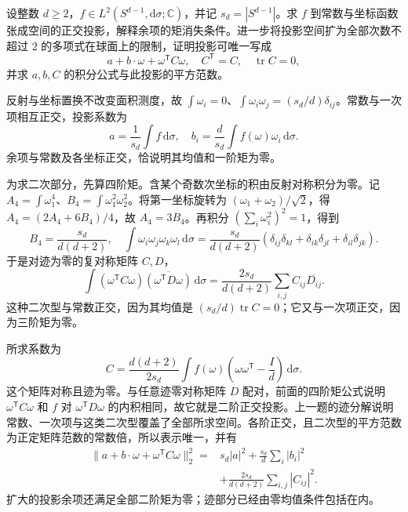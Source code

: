 \begin{exercise}\label{b2:ex:B2-sphere-projection}
设整数 \(d\ge2\)，\(f\in L^2(S^{d-1},\mathrm d\sigma;\mathbb C)\)，并记 \(s_d=|S^{d-1}|\)。求 \(f\) 到常数与坐标函数张成空间的正交投影，解释余项的矩消失条件。进一步将投影空间扩为全部次数不超过 \(2\) 的多项式在球面上的限制，证明投影可唯一写成
\[
 a+b\cdot\omega+\omega^{\mathsf T}C\omega,
 \quad C^{\mathsf T}=C,\quad\operatorname{tr}C=0,
\]
并求 \(a,b,C\) 的积分公式与此投影的平方范数。
\end{exercise}
\begin{solution}
反射与坐标置换不改变面积测度，故 \(\int\omega_i=0\)、\(\int\omega_i\omega_j=(s_d/d)\delta_{ij}\)。常数与一次项相互正交，投影系数为
\[
 a=\frac1{s_d}\int f\,\mathrm d\sigma,
 \quad b_i=\frac d{s_d}\int f(\omega)\omega_i\,\mathrm d\sigma.
\]
余项与常数及各坐标正交，恰说明其均值和一阶矩为零。

为求二次部分，先算四阶矩。含某个奇数次坐标的积由反射对称积分为零。记 \(A_4=\int\omega_1^4\)、\(B_4=\int\omega_1^2\omega_2^2\)。将第一坐标旋转为 \((\omega_1+\omega_2)/\sqrt2\)，得 \(A_4=(2A_4+6B_4)/4\)，故 \(A_4=3B_4\)。再积分 \((\sum_i\omega_i^2)^2=1\)，得到
\[
 B_4=\frac{s_d}{d(d+2)},\quad
 \int\omega_i\omega_j\omega_k\omega_l\,\mathrm d\sigma
 =\frac{s_d}{d(d+2)}
 (\delta_{ij}\delta_{kl}+\delta_{ik}\delta_{jl}+\delta_{il}\delta_{jk}).
\]
于是对迹为零的复对称矩阵 \(C,D\)，
\[
 \int(\omega^{\mathsf T}C\omega)
       \overline{(\omega^{\mathsf T}D\omega)}\,\mathrm d\sigma
 =\frac{2s_d}{d(d+2)}\sum_{i,j}C_{ij}\overline{D_{ij}}.
\]
这种二次型与常数正交，因为其均值是 \((s_d/d)\operatorname{tr}C=0\)；它又与一次项正交，因为三阶矩为零。

所求系数为
\[
 C=\frac{d(d+2)}{2s_d}
      \int f(\omega)\left(\omega\omega^{\mathsf T}-\frac Id\right)
                       \,\mathrm d\sigma.
\]
这个矩阵对称且迹为零。与任意迹零对称矩阵 \(D\) 配对，前面的四阶矩公式说明 \(\omega^{\mathsf T}C\omega\) 和 \(f\) 对 \(\omega^{\mathsf T}D\omega\) 的内积相同，故它就是二阶正交投影。上一题的迹分解说明常数、一次项与这类二次型覆盖了全部所求空间。各阶正交，且二次型的平方范数为正定矩阵范数的常数倍，所以表示唯一，并有
\[
 \begin{aligned}
 \|a+b\cdot\omega+\omega^{\mathsf T}C\omega\|_2^2
 ={}&s_d|a|^2+\frac{s_d}{d}\sum_i|b_i|^2\\
 &+\frac{2s_d}{d(d+2)}\sum_{i,j}|C_{ij}|^2.
 \end{aligned}
\]
扩大的投影余项还满足全部二阶矩为零；迹部分已经由零均值条件包括在内。
\end{solution}

